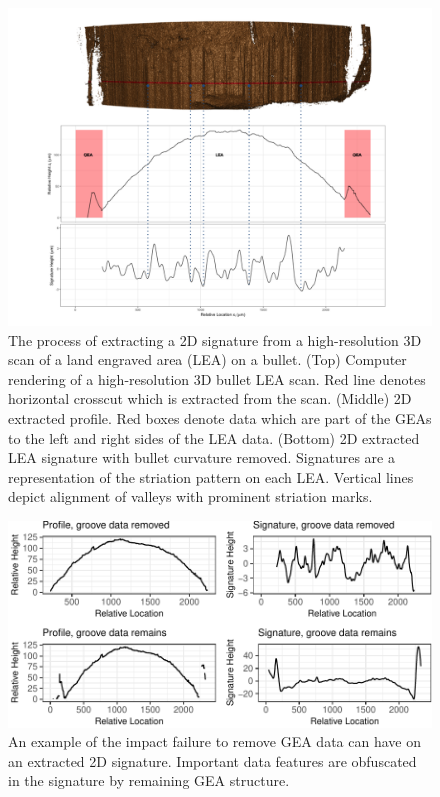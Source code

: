 \documentclass[12pt]{article}
\begin{document}
\begin{figure}
\centering
\includegraphics[width=\textwidth]{../images/process_vertical_png}
\caption{The process of extracting a 2D signature from a high-resolution 3D scan of a land engraved area (LEA) on a bullet. (Top) Computer rendering of a high-resolution 3D bullet LEA scan. Red line denotes horizontal crosscut which is extracted from the scan. (Middle) 2D extracted profile. Red boxes denote data which are part of the GEAs to the left and right sides of the LEA data. (Bottom) 2D extracted LEA signature with bullet curvature removed. Signatures are a representation of the striation pattern on each LEA. Vertical lines depict alignment of valleys with prominent striation marks.}  
\label{processing-process}
\end{figure}

\begin{figure}
\centering
\includegraphics{writeup_files/figure-latex/groove-no-groove-1.pdf}
\caption{\label{groove-no-groove}An example of the impact failure to
remove GEA data can have on an extracted 2D signature. Important data
features are obfuscated in the signature by remaining GEA structure.}
\end{figure}
\end{document}
